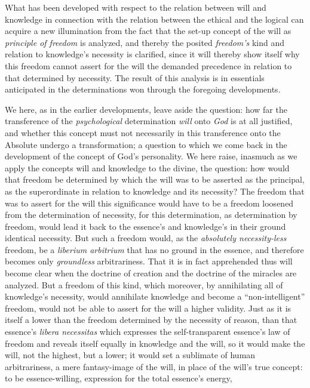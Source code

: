 \documentclass[12pt,a4paper]{book}
\begin{document}
What has been developed with respect to the relation between will and knowledge in
connection with the relation between the ethical and the logical can acquire a new
illumination from the fact that the set-up concept of the will as \emph{principle of
freedom} is analyzed, and thereby the posited \emph{freedom's} kind and relation to
knowledge's necessity is clarified, since it will thereby show itself why this
freedom cannot assert for the will the demanded precedence in relation to that
determined by necessity. The result of this analysis is in essentials anticipated in
the determinations won through the foregoing developments.

We here, as in the earlier developments, leave aside the question: how far the
transference of the \emph{psychological} determination \emph{will} onto \emph{God} is at all justified,
and whether this concept must not necessarily in this transference onto the Absolute
undergo a transformation; a question to which we come back in the development of the
concept of God's personality. We here raise, inasmuch as we apply the concepts will
and knowledge to the divine, the question: how would that freedom be determined by
which the will was to be asserted as the principal, as the superordinate in relation
to knowledge and its necessity? The freedom that was to assert for the will this
significance would have to be a freedom loosened from the determination of necessity,
for this determination, as determination by freedom, would lead it back to the
essence's and knowledge's in their ground identical necessity. But such a freedom
would, as the \emph{absolutely necessity-less} freedom, be a \emph{\textit{liberium
arbitrium}} that has no ground in the essence, and therefore becomes only \emph{groundless}
arbitrariness. That it is in fact apprehended thus will become clear when the doctrine
of creation and the doctrine of the miracles are analyzed. But a freedom of this kind,
which moreover, by annihilating all of knowledge's necessity, would annihilate
knowledge and become a ``non-intelligent'' freedom, would not be able to assert for the
will a higher validity. Just as it is itself a lower than the freedom determined by the
necessity of reason, than that essence's \textit{libera necessitas} which expresses the
self-transparent essence's law of freedom and reveals itself equally in knowledge and
the will, so it would make the will, not the highest, but a lower; it would set a
sublimate of human arbitrariness, a mere fantasy-image of the will, in place of the
will's true concept: to be essence-willing, expression for the total essence's energy,
\end{document}
